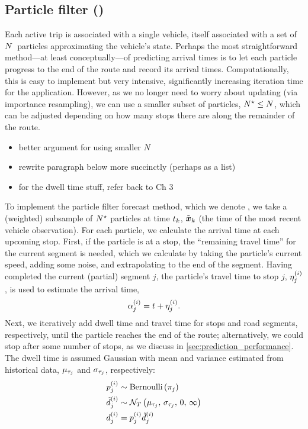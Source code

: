 \subsection{Particle filter (\Fpf{})}
\label{sec:prediction_arrival_time_pf}

Each active trip is associated with a single vehicle, itself associated with a set of  $N$~particles approximating the vehicle's state. Perhaps the most straightforward method---at least conceptually---of predicting arrival times is to let each particle progress to the end of the route and record its arrival times. Computationally, this is easy to implement but very intensive, significantly increasing iteration time for the application. However, as we no longer need to worry about updating (via importance resampling), we can use a smaller subset of particles, $N^\star \leq N$, which can be adjusted depending on how many stops there are along the remainder of the route.

\begin{itemize}
\item better argument for using smaller $N$
\item rewrite paragraph below more succinctly (perhaps as a list)
\item for the dwell time stuff, refer back to Ch 3
\end{itemize}


To implement the particle filter forecast method, which we denote \Fpf{}, we take a (weighted) subsample of $N^\star$ particles at time $t_k$, $\tilde{\boldsymbol x}_k$ (the time of the most recent vehicle observation). For each particle, we calculate the arrival time at each upcoming stop. First, if the particle is at a stop,  the ``remaining travel time'' for the current segment is needed, which we calculate by taking the particle's current speed, adding some noise, and extrapolating to the end of the segment. Having completed the current (partial) segment $j$, the particle's travel time to stop $j$, $\eta^{(i)}_j$, is used to estimate the arrival time,
\begin{equation}
\label{eq:particle_arrival_time}
\alpha^{(i)}_j = t + \eta^{(i)}_j.
\end{equation}
Next, we iteratively add dwell time and travel time for stops and road segments, respectively, until the particle reaches the end of the route; alternatively, we could stop after some number of stops, as we discuss in \cref{sec:prediction_performance}. The dwell time is assumed Gaussian with mean and variance estimated from historical data, $\mu_{\tau_j}$ and $\sigma_{\tau_j}$, respectively:
\begin{equation}
\label{eq:prediction_dwell_time}
\begin{split}
p^{(i)}_j &\sim \mathrm{Bernoulli}\left(\pi_j\right) \\
\tilde d^{(i)}_j &\sim \mathcal{N}_T\left(\mu_{\tau_j},\, \sigma_{\tau_j},\, 0,\, \infty\right) \\
d^{(i)}_j &= p^{(i)}_j \tilde d^{(i)}_j
\end{split}
\end{equation}



